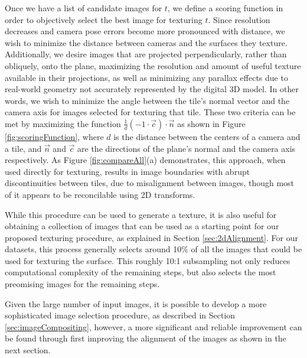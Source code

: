 \documentclass[]{spie}  %
\begin{document}
Once we have a list of candidate images for $t$, we define a scoring
function in order to objectively select the best image for texturing
$t$. Since resolution decreases and camera pose errors become more
pronounced with distance, we wish to minimize the distance between
cameras and the surfaces they texture. Additionally, we desire images
that are projected perpendicularly, rather than obliquely, onto the
plane, maximizing the resolution and amount of useful texture
available in their projections, as well as minimizing any parallax
effects due to real-world geometry not accurately represented by the
digital 3D model. In other words, we wish to minimize the angle
between the tile's normal vector and the camera axis for images
selected for texturing that tile. These two criteria can be met by
maximizing the function $\frac{1}{d} (-1 \cdot \vec{c}) \cdot \vec{n}$
as shown in Figure \ref{fig:scoringFunction}, where $d$ is the
distance between the centers of a camera and a tile, and $\vec{n}$ and
$\vec{c}$ are the directions of the plane's normal and the camera axis
respectively. As Figure \ref{fig:compareAll}(a) demonstrates, this
approach, when used directly for texturing, results in image
boundaries with abrupt discontinuities between tiles, due to
misalignment between images, though most of it appears to be
reconcilable using 2D transforms.

While this procedure can be used to generate a texture, it is also
useful for obtaining a collection of images that can be used as a
starting point for our proposed texturing procedure, as explained in
Section \ref{sec:2dAlignment}. For our datasets, this process
generally selects around 10\% of all the images that could be used for
texturing the surface. This roughly 10:1 subsampling not only reduces
computational complexity of the remaining steps, but also selects the
most preomising images for the remaining steps.

Given the large number of input images, it is possible to develop a
more sophisticated image selection procedure, as described in Section
\ref{sec:imageCompositing}, however, a more significant and reliable
improvement can be found through first improving the alignment of the
images as shown in the next section.
\end{document}
